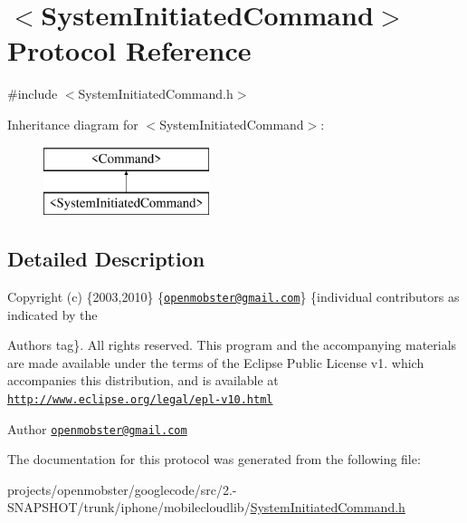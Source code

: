 \hypertarget{protocol_system_initiated_command-p}{
\section{$<$\-System\-Initiated\-Command$>$ \-Protocol \-Reference}
\label{protocol_system_initiated_command-p}
}


{\ttfamily \#include $<$\-System\-Initiated\-Command.\-h$>$}

\-Inheritance diagram for $<$\-System\-Initiated\-Command$>$\-:\begin{figure}[H]
\begin{center}
\leavevmode
\includegraphics[height=2.000000cm]{protocol_system_initiated_command-p}
\end{center}
\end{figure}


\subsection{\-Detailed \-Description}
\-Copyright (c) \{2003,2010\} \{\href{mailto:openmobster@gmail.com}{\tt openmobster@gmail.\-com}\} \{individual contributors as indicated by the \begin{DoxyAuthor}{\-Authors}
tag\}. \-All rights reserved. \-This program and the accompanying materials are made available under the terms of the \-Eclipse \-Public \-License v1. which accompanies this distribution, and is available at \href{http://www.eclipse.org/legal/epl-v10.html}{\tt http\-://www.\-eclipse.\-org/legal/epl-\/v10.\-html}
\end{DoxyAuthor}
\begin{DoxyAuthor}{\-Author}
\href{mailto:openmobster@gmail.com}{\tt openmobster@gmail.\-com} 
\end{DoxyAuthor}


\-The documentation for this protocol was generated from the following file\-:\begin{DoxyCompactItemize}
\item 
projects/openmobster/googlecode/src/2.-\/\-S\-N\-A\-P\-S\-H\-O\-T/trunk/iphone/mobilecloudlib/\hyperlink{_system_initiated_command_8h}{\-System\-Initiated\-Command.\-h}\end{DoxyCompactItemize}
